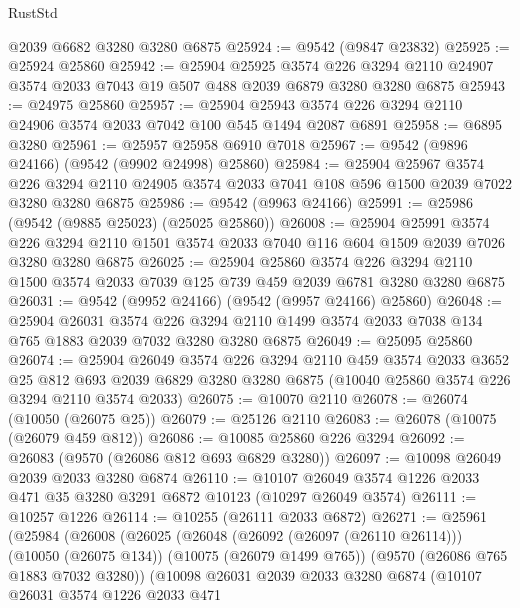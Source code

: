 \begin{lexlean}{RustStd}
\begin{coremodule}
    @2039
    @6682
    @3280
    @3280
    @6875
@25924 := @9542 (@9847 @23832)
@25925 := @25924 @25860
@25942 := @25904
    @25925
    @3574
    @226
    @3294
    @2110
    @24907
    @3574
    @2033
    @7043
    @19
    @507
    @488
    @2039
    @6879
    @3280
    @3280
    @6875
@25943 := @24975 @25860
@25957 := @25904 @25943 @3574 @226 @3294 @2110 @24906 @3574 @2033 @7042 @100 @545 @1494 @2087 @6891
@25958 := @6895 @3280
@25961 := @25957 @25958 @6910 @7018
@25967 := @9542 (@9896 @24166) (@9542 (@9902 @24998) @25860)
@25984 := @25904
    @25967
    @3574
    @226
    @3294
    @2110
    @24905
    @3574
    @2033
    @7041
    @108
    @596
    @1500
    @2039
    @7022
    @3280
    @3280
    @6875
@25986 := @9542 (@9963 @24166)
@25991 := @25986 (@9542 (@9885 @25023) (@25025 @25860))
@26008 := @25904
    @25991
    @3574
    @226
    @3294
    @2110
    @1501
    @3574
    @2033
    @7040
    @116
    @604
    @1509
    @2039
    @7026
    @3280
    @3280
    @6875
@26025 := @25904
    @25860
    @3574
    @226
    @3294
    @2110
    @1500
    @3574
    @2033
    @7039
    @125
    @739
    @459
    @2039
    @6781
    @3280
    @3280
    @6875
@26031 := @9542 (@9952 @24166) (@9542 (@9957 @24166) @25860)
@26048 := @25904
    @26031
    @3574
    @226
    @3294
    @2110
    @1499
    @3574
    @2033
    @7038
    @134
    @765
    @1883
    @2039
    @7032
    @3280
    @3280
    @6875
@26049 := @25095 @25860
@26074 := @25904
    @26049
    @3574
    @226
    @3294
    @2110
    @459
    @3574
    @2033
    @3652
    @25
    @812
    @693
    @2039
    @6829
    @3280
    @3280
    @6875
    (@10040 @25860 @3574 @226 @3294 @2110 @3574 @2033)
@26075 := @10070 @2110
@26078 := @26074 (@10050 (@26075 @25))
@26079 := @25126 @2110
@26083 := @26078 (@10075 (@26079 @459 @812))
@26086 := @10085 @25860 @226 @3294
@26092 := @26083 (@9570 (@26086 @812 @693 @6829 @3280))
@26097 := @10098 @26049 @2039 @2033 @3280 @6874
@26110 := @10107 @26049 @3574 @1226 @2033 @471 @35 @3280 @3291 @6872 @10123 (@10297 @26049 @3574)
@26111 := @10257 @1226
@26114 := @10255 (@26111 @2033 @6872)
@26271 := @25961
    (@25984
      (@26008
        (@26025
          (@26048
            (@26092 (@26097 (@26110 @26114)))
            (@10050 (@26075 @134))
            (@10075 (@26079 @1499 @765))
            (@9570 (@26086 @765 @1883 @7032 @3280))
            (@10098
              @26031
              @2039
              @2033
              @3280
              @6874
              (@10107
                @26031
                @3574
                @1226
                @2033
                @471

\end{coremodule}
\end{lexlean}
